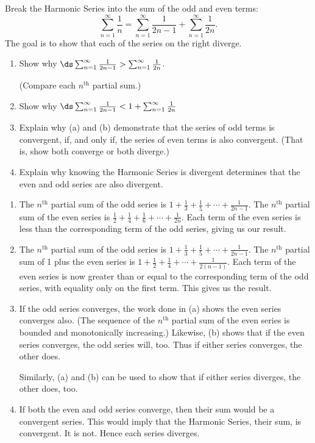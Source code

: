 {\label{08_02_ex_24} Break the Harmonic Series into the sum of the odd and even terms:
$$\sum_{n=1}^\infty \frac1n = \sum_{n=1}^\infty \frac{1}{2n-1}+\sum_{n=1}^\infty \frac{1}{2n}.$$ The goal is to show that each of the series on the right diverge.
		\begin{enumerate}
		\item		Show why $\ds \sum_{n=1}^\infty \frac{1}{2n-1}>\sum_{n=1}^\infty \frac{1}{2n}$. 
		
		(Compare each $n^\text{th}$ partial sum.)
		\item		Show why $\ds\sum_{n=1}^\infty \frac{1}{2n-1}<1+\sum_{n=1}^\infty \frac{1}{2n}$
		\item		Explain why (a) and (b) demonstrate that the series of odd terms is convergent, if, and only if, the series of even terms is also convergent. (That is, show both converge or both diverge.)
		\item		Explain why knowing the Harmonic Series is divergent determines that the even and odd series are also divergent.
		\end{enumerate}
}
{\begin{enumerate}
\item		The $n^\text{th}$ partial sum of the odd series is $1+\frac13+\frac15+\cdots+\frac{1}{2n-1}$. The $n^\text{th}$ partial sum of the even series is $\frac12+\frac14 + \frac16 + \cdots +\frac1{2n}$. Each term of the even series is less than the corresponding term of the odd series, giving us our result.
\item		The $n^\text{th}$ partial sum of the odd series is $1+\frac13+\frac15+\cdots+\frac1{2n-1}$. The $n^\text{th}$ partial sum of 1 plus the even series is $1+\frac12+\frac14+\cdots + \frac{1}{2(n-1)}$. Each term of the even series is now greater than or equal to the corresponding term of the odd series, with equality only on the first term. This gives us the result.
\item		If the odd series converges, the work done in (a) shows the even series converges also. (The sequence of the $n^\text{th}$ partial sum of the even series is bounded and monotonically increasing.) Likewise, (b) shows that if the even series converges, the odd series will, too. Thus if either series converges, the other does. 

Similarly, (a) and (b) can be used to show that if either series diverges, the other does, too.
\item		If both the even and odd series converge, then their sum would be a convergent series. This would imply that the Harmonic Series, their sum, is convergent. It is not. Hence each series diverges.
\end{enumerate}
}
